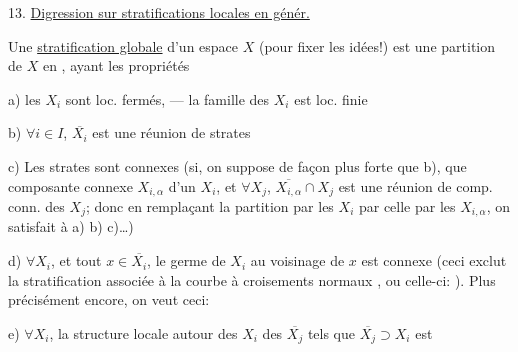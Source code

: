 
13. \uline{Digression sur stratifications locales en génér.}

Une \uline{stratification globale} d'un espace  $X$ (pour fixer les idées!) est une partition de $X$ en ,  ayant les propriétés

a) les $X_i$ sont loc. fermés, --- la famille des $X_i$ est loc. finie

b) $\forall i\in I$, $\overline{X_i}$ est une réunion de strates

c) Les strates sont  connexes (si, on suppose de façon plus forte que b), que    composante connexe  $X_{i,\alpha}$ d'un $X_i$, et $\forall X_j$, $\overline{X_{i,\alpha}}\cap X_j$ est une réunion de comp. conn. des $X_j$; donc en remplaçant la partition par les $X_i$ par celle par les $X_{i,\alpha}$, on satisfait à a) b) c)\ldots)

d)  $\forall X_i$, et tout $x\in\overline{X_i}$, le germe  de $X_i$ au voisinage de $x$ est connexe (ceci exclut la stratification associée à la courbe à croisements normaux
,
ou celle-ci:
).
Plus précisément encore, on veut ceci:

e) $\forall X_i$, la structure locale autour des $X_i$  des $\overline{X_j}$ tels que $\overline{X_j}\supset X_i$ est 

